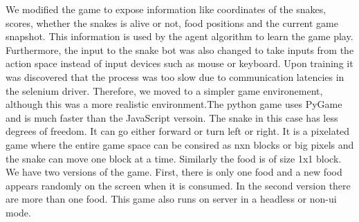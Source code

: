 \documentclass[conference,10pt]{IEEEtran}
\begin{document}
	\break
	\break
	We modified the game to expose information like coordinates of the snakes, scores, whether the snakes is alive or not, food positions and the current game snapshot. This information is used by the agent algorithm to learn the game play. Furthermore, the input to the snake bot was also changed to take inputs from the action space instead of input devices such as mouse or keyboard.
	\break
	Upon training it was discovered that the process was too slow due to communication latencies in the selenium driver. Therefore, we moved to a simpler game environement, although this was a more realistic environment.The python game uses PyGame and is much faster than the JavaScript versoin. The snake in this case has less degrees of freedom. It can go either forward or turn left or right. It is a pixelated game where the entire game space can be consired as nxn blocks or big pixels and the snake can move one block at a time. Similarly the food is of size 1x1 block. We have two versions of the game. First, there is only one food and a new food appears randomly on the screen when it is consumed. In the second version there are more than one food. This game also runs on server in a headless or non-ui mode.
	
\end{document}
